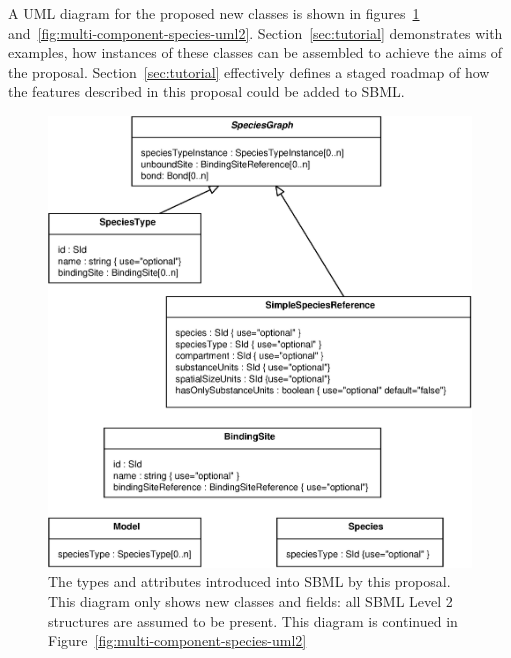 \documentclass{cekarticle}
\begin{document}
A UML diagram for the proposed new classes is shown in
figures~\ref{fig:multi-component-species-uml} and~\ref{fig:multi-component-species-uml2}.
Section~\ref{sec:tutorial}
demonstrates with examples, how instances of these classes can be assembled to
achieve the aims of the proposal.  Section~\ref{sec:tutorial} effectively defines a staged roadmap
of how the features described in this proposal could be added to SBML.

\begin{figure}[h]
  \vspace*{8pt}
  \centering
  \includegraphics[scale = 0.7]{multi-component-species-uml.eps}
  \caption{The types and attributes introduced into SBML by this proposal.  This diagram
  only shows new classes and fields: all SBML Level 2 structures are assumed to be present.
  This diagram is continued in Figure~\ref{fig:multi-component-species-uml2}}
  \label{fig:multi-component-species-uml}
\end{figure}
\end{document}
